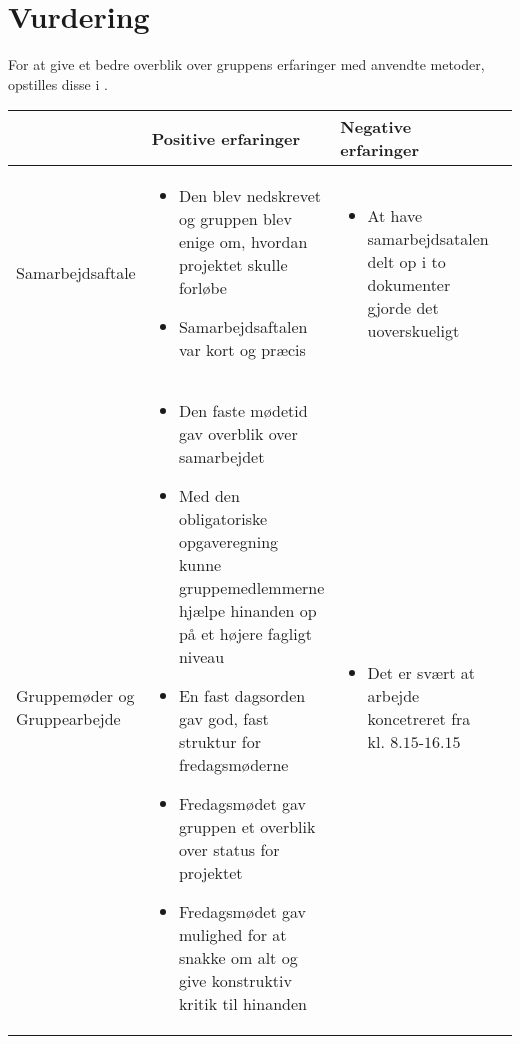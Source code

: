 \section{Vurdering}
For at give et bedre overblik over gruppens erfaringer med anvendte metoder, opstilles disse i .

\begin{table}[h]
	\begin{tabular}{l|l|l|l|}
		\cline{2-4}
		& Positive erfaringer                              & Negative erfaringer        \\ \hline
		\multicolumn{1}{|l|}{Samarbejdsaftale}             & 
		    \begin{itemize} %
		    	\item{Den blev nedskrevet og gruppen blev enige om, hvordan projektet skulle forløbe}
		    	\item{Samarbejdsaftalen var kort og præcis}
	    	\end{itemize}                                  &  
	                                                       \begin{itemize}    %
	                                                    	    \item{At have samarbejdsatalen delt op i to dokumenter gjorde det uoverskueligt}
	                                                       \end{itemize}                                  \\ \hline
		\multicolumn{1}{|l|}{Gruppemøder og Gruppearbejde} &     
		     \begin{itemize} %
		     	\item{Den faste mødetid gav overblik over samarbejdet}
		     	\item{Med den obligatoriske opgaveregning kunne gruppemedlemmerne hjælpe hinanden op på et højere fagligt niveau}
		     	\item{En fast dagsorden gav god, fast struktur for fredagsmøderne}
		     	\item{Fredagsmødet gav gruppen et overblik over status for projektet}
		     	\item{Fredagsmødet gav mulighed for at snakke om alt og give konstruktiv kritik til hinanden}
		     \end{itemize}                                 &      
		                                                   \begin{itemize} %
		     	                                                \item{Det er svært at arbejde koncetreret fra kl. $8.15$-$16.15$}

\end{itemize}
\end{tabular}
\end{table}
